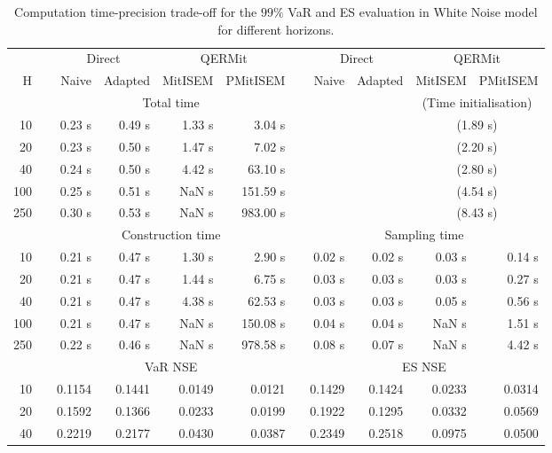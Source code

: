 \footnotesize{  
{ \renewcommand{\arraystretch}{1.3} 
\begin{longtable}{rr rrrr r rrrr}  
\caption{Computation time-precision trade-off for the  $99\%$ VaR and ES evaluation in White Noise model for different horizons.} 
\label{tab:time_precision_WN} \\ 
 & & \multicolumn{2}{c}{Direct} & \multicolumn{2}{c}{QERMit}&  & \multicolumn{2}{c}{Direct} & \multicolumn{2}{c}{QERMit} \\ \cline{3-6} \cline{8-11} 
 H & & Naive & Adapted & MitISEM & PMitISEM & & Naive & Adapted & MitISEM & PMitISEM \\ \hline 
 & & \multicolumn{4}{c}{Total time} & & && \multicolumn{2}{c}{(Time initialisation)} \\ \cline{3-6} \cline{10-11}
10 & & 0.23 s & 0.49 s & 1.33 s & 3.04 s &&&& \multicolumn{2}{c}{(1.89 s)} \\ 
20 & & 0.23 s & 0.50 s & 1.47 s & 7.02 s &&&& \multicolumn{2}{c}{(2.20 s)} \\ 
40 & & 0.24 s & 0.50 s & 4.42 s & 63.10 s &&&& \multicolumn{2}{c}{(2.80 s)} \\ 
100 & & 0.25 s & 0.51 s &  NaN s & 151.59 s &&&& \multicolumn{2}{c}{(4.54 s)} \\ 
250 & & 0.30 s & 0.53 s &  NaN s & 983.00 s &&&& \multicolumn{2}{c}{(8.43 s)} \\ 
\hline 
 & & \multicolumn{4}{c}{Construction time} & & \multicolumn{4}{c}{ Sampling time} \\ \cline{3-6}  \cline{8-11}
10 & & 0.21 s & 0.47 s & 1.30 s & 2.90 s && 0.02 s & 0.02 s & 0.03 s & 0.14 s \\ 
20 & & 0.21 s & 0.47 s & 1.44 s & 6.75 s && 0.03 s & 0.03 s & 0.03 s & 0.27 s \\ 
40 & & 0.21 s & 0.47 s & 4.38 s & 62.53 s && 0.03 s & 0.03 s & 0.05 s & 0.56 s \\ 
100 & & 0.21 s & 0.47 s &  NaN s & 150.08 s && 0.04 s & 0.04 s &  NaN s & 1.51 s \\ 
250 & & 0.22 s & 0.46 s &  NaN s & 978.58 s && 0.08 s & 0.07 s &  NaN s & 4.42 s \\ 
\hline 
 & & \multicolumn{4}{c}{VaR NSE} &&  \multicolumn{4}{c}{ES NSE} \\ \cline{3-6}  \cline{8-11}
10 && 0.1154  & 0.1441  & 0.0149 & 0.0121 && 0.1429  & 0.1424  & 0.0233 & 0.0314 \\ 
20 && 0.1592  & 0.1366  & 0.0233 & 0.0199 && 0.1922  & 0.1295  & 0.0332 & 0.0569 \\ 
40 && 0.2219  & 0.2177  & 0.0430 & 0.0387 && 0.2349  & 0.2518  & 0.0975 & 0.0500 \\ 

\end{longtable}}}
